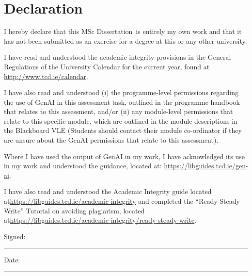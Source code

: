 \documentclass[a4paper,oneside,12pt]{book}
\newcommand{\typeofthesis}{MSc Dissertation}
\begin{document}
\frontmatter

\doublespacing

\chapter*{Declaration}
I hereby declare that this \typeofthesis\ is entirely my own work and that it has not been submitted as an exercise for a degree at this or any other university.

I have read and understood the academic integrity provisions in the General Regulations of the University Calendar for the current year, found at \url{http://www.tcd.ie/calendar}.

I have also read and understood (i) the programme-level permissions regarding the use of GenAI in this assessment task, outlined in the programme handbook that relates to this assessment, and/or (ii) any module-level permissions that relate to this specific module, which are outlined in the module descriptions in the Blackboard VLE (Students should contact their module co-ordinator if they are unsure about the GenAI permissions that relate to this assessment).

Where I have used the output of GenAI in my work, I have acknowledged its use in my work and understood the guidance, located at: \url{https://libguides.tcd.ie/gen-ai}.

{\RaggedRight I have also read and understood the Academic Integrity guide located at\linebreak \url{https://libguides.tcd.ie/academic-integrity} and completed the ``Ready Steady Write'' Tutorial on avoiding plagiarism, located at\linebreak \url{https://libguides.tcd.ie/academic-integrity/ready-steady-write}.\par}

\vspace{1cm}
Signed:~\rule{5cm}{0.3pt}\hfill Date:~\rule{5cm}{0.3pt}

\newpage
\end{document}
